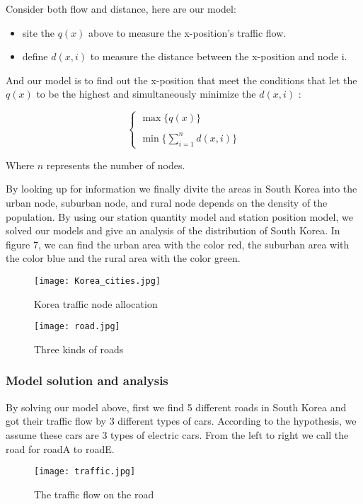 \documentclass[12pt]{article}  %
\begin{document}
Consider both flow and distance, here are our model:
\begin{itemize}
	\item site the $q(x)$ above to measure the x-position's traffic flow.
	\item define $d(x,i)$ to measure the distance between the x-position and node i. 
\end{itemize}

And our model is to find out the x-position that meet the conditions that let the $q(x)$ to be the highest and simultaneously minimize the $d(x,i)$ :

\begin{equation}
\left\{ {\begin{array}{*{20}{c}}
	{\max \{ q(x)\} }\\
	{}\\
	{\min \{ \sum\limits_{i = 1}^n {d(x,i)\} } }
	\end{array}} \right.
\end{equation}

Where $n$ represents the number of nodes.

By looking up for information we finally divite the areas in South Korea into the urban node, suburban node, and rural node depends on the density of the population. By using our station quantity model and station position model, we solved our models and give an analysis of the distribution of South Korea. In figure 7, we can find the urban area with the color red, the suburban area with the color blue and the rural area with the color green.
\begin{figure}[H]
	\centering
	\texttt{[image: Korea\_cities.jpg]}
	\caption{Korea traffic node allocation}\label{fig:7}
\end{figure}
\begin{figure}[H]
	\centering
	\texttt{[image: road.jpg]}
	\caption{Three kinds of roads}\label{fig:8}
\end{figure}
\subsubsection{Model solution and analysis}
By solving our model above, first we find 5 different roads in South Korea and got their traffic flow by 3 different types of cars. According to the hypothesis, we assume these cars are 3 types of electric cars. From the left to right we call the road for roadA to roadE. 
\begin{figure}[H]
	\centering
	\texttt{[image: traffic.jpg]}
	\caption{The traffic flow on the road}\label{fig:9}
\end{figure}
\end{document}
